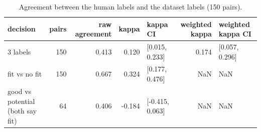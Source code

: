 \begin{table}
\caption{Agreement between the human labels and the dataset labels (150 pairs).}
\label{tab:t7_agreement}
\begin{tabular}{lrrrlrl}
\toprule
decision & pairs & raw agreement & kappa & kappa CI & weighted kappa & weighted kappa CI \\
\midrule
3 labels & 150 & 0.413 & 0.120 & [0.015, 0.233] & 0.174 & [0.057, 0.296] \\
fit vs no fit & 150 & 0.667 & 0.324 & [0.177, 0.476] & NaN & NaN \\
good vs potential (both say fit) & 64 & 0.406 & -0.184 & [-0.415, 0.063] & NaN & NaN \\
\bottomrule
\end{tabular}
\end{table}
